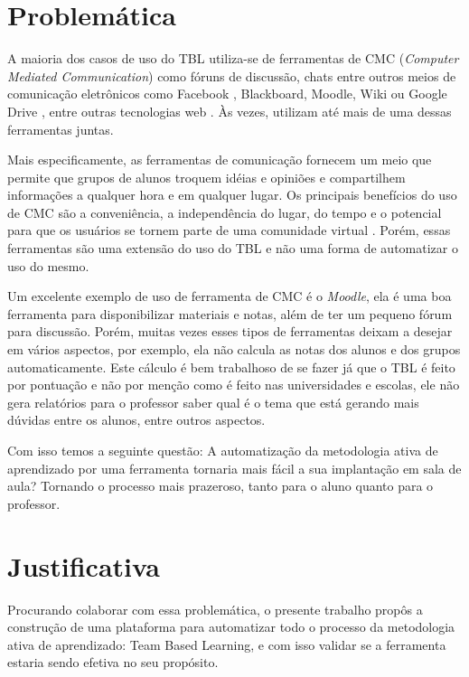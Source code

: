 \section{Problemática}

A maioria dos casos de uso do TBL utiliza-se de ferramentas de CMC (\textit{Computer Mediated Communication}) como fóruns de discussão, chats entre outros meios de comunicação eletrônicos como Facebook \cite{alhomod}, Blackboard, Moodle, Wiki ou Google Drive \cite{awatramani}, entre outras tecnologias web \cite{kam}. Às vezes, utilizam até mais de uma dessas ferramentas juntas.

Mais especificamente, as ferramentas de comunicação fornecem um meio que permite que grupos de alunos troquem idéias e opiniões e compartilhem informações a qualquer hora e em qualquer lugar. Os principais benefícios do uso de CMC são a conveniência, a independência do lugar, do tempo e o potencial para que os usuários se tornem parte de uma comunidade virtual \cite{berge}. Porém, essas ferramentas são uma extensão do uso do TBL e não uma forma de automatizar o uso do mesmo.

Um excelente exemplo de uso de ferramenta de CMC é o \textit{Moodle}, ela é uma boa ferramenta para disponibilizar materiais e notas, além de ter um pequeno fórum para discussão. Porém, muitas vezes esses tipos de ferramentas deixam a desejar em vários aspectos, por exemplo, ela não calcula as notas dos alunos e dos grupos automaticamente. Este cálculo é bem trabalhoso de se fazer já que o TBL é feito por pontuação e não por menção como é feito nas universidades e escolas, ele não gera relatórios para o professor saber qual é o tema que está gerando mais dúvidas entre os alunos, entre outros aspectos.

Com isso temos a seguinte questão: A automatização da metodologia ativa de aprendizado por uma ferramenta tornaria mais fácil a sua implantação em sala de aula? Tornando o processo mais prazeroso, tanto para o aluno quanto para o professor.

\section{Justificativa}

Procurando colaborar com essa problemática, o presente trabalho propôs a construção de uma plataforma para automatizar todo o processo da metodologia ativa de aprendizado: Team Based Learning, e com isso validar se a ferramenta estaria sendo efetiva no seu propósito.

